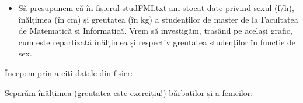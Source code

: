 \documentclass[]{article}
\newenvironment{Shaded}{\begin{snugshade}}{\end{snugshade}}
\newcommand{\KeywordTok}[1]{\textcolor[rgb]{0.13,0.29,0.53}{\textbf{#1}}}
\newcommand{\DataTypeTok}[1]{\textcolor[rgb]{0.13,0.29,0.53}{#1}}
\newcommand{\DecValTok}[1]{\textcolor[rgb]{0.00,0.00,0.81}{#1}}
\newcommand{\StringTok}[1]{\textcolor[rgb]{0.31,0.60,0.02}{#1}}
\newcommand{\OtherTok}[1]{\textcolor[rgb]{0.56,0.35,0.01}{#1}}
\newcommand{\OperatorTok}[1]{\textcolor[rgb]{0.81,0.36,0.00}{\textbf{#1}}}
\newcommand{\ErrorTok}[1]{\textcolor[rgb]{0.64,0.00,0.00}{\textbf{#1}}}
\newcommand{\NormalTok}[1]{#1}
\newenvironment{frshaded*}{%
  \def\FrameCommand{\fboxrule=\FrameRule\fboxsep=\FrameSep \fcolorbox{framecolor}{shadecolor1}}%
  \MakeFramed {\advance\hsize-\width \FrameRestore}}%
{\endMakeFramed}
\newenvironment{rmdblock}[1]
  {\begin{frshaded*}
  \begin{itemize}
  \renewcommand{\labelitemi}{
    \raisebox{-.7\height}[0pt][0pt]{
      {\setkeys{Gin}{width=2em,keepaspectratio}\texttt{[image: images/icons/\#1]}}
    }
  }
  \item
  }
  {
  \end{itemize}
  \end{frshaded*}
  }
\newenvironment{rmdexercise}
  {\begin{rmdblock}{exercise}}
  {\end{rmdblock}}
\begin{document}
\begin{rmdexercise}
Să presupunem că în fișierul
\href{\%22dataIn/studFMI.txt\%22}{studFMI.txt} am stocat date privind
sexul (f/h), înălțimea (în cm) și greutatea (în kg) a studenților de
master de la Facultatea de Matematică și Informatică. Vrem să
investigăm, trasând pe același grafic, cum este repartizată înălțimea și
respectiv greutatea studenților în funcție de sex.
\end{rmdexercise}

Începem prin a citi datele din fișier:

\begin{Shaded}
\end{Shaded}

Separăm înălțimea (greutatea este exercițiu!) bărbaților și a femeilor:
\end{document}
